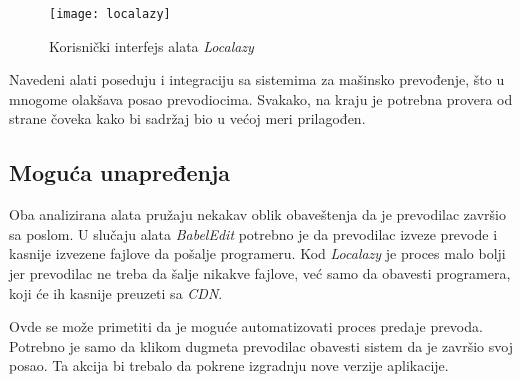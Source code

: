 \begin{figure}[h]
    \centering
    \texttt{[image: localazy]}
    \caption{Korisnički interfejs alata \textit{Localazy}}
    \label{fig:localazy}
\end{figure}

Navedeni alati poseduju i integraciju sa sistemima za mašinsko prevođenje, što u mnogome olakšava posao 
prevodiocima. Svakako, na kraju je potrebna provera od strane čoveka kako bi sadržaj bio u većoj meri prilagođen. 

\subsection{Moguća unapređenja}\label{sec:analiza-moguca_unapredjenja}

Oba analizirana alata pružaju nekakav oblik obaveštenja da je prevodilac završio sa poslom. U slučaju alata \textit{BabelEdit}
potrebno je da prevodilac izveze prevode i kasnije izvezene fajlove da pošalje programeru. Kod \textit{Localazy} 
je proces malo bolji jer prevodilac ne treba da šalje nikakve fajlove, već samo da obavesti programera, 
koji će ih kasnije preuzeti sa \textit{CDN}.

Ovde se može primetiti da je moguće automatizovati proces predaje prevoda. Potrebno je samo da klikom dugmeta
prevodilac obavesti sistem da je završio svoj posao. Ta akcija bi trebalo da pokrene izgradnju nove verzije aplikacije.